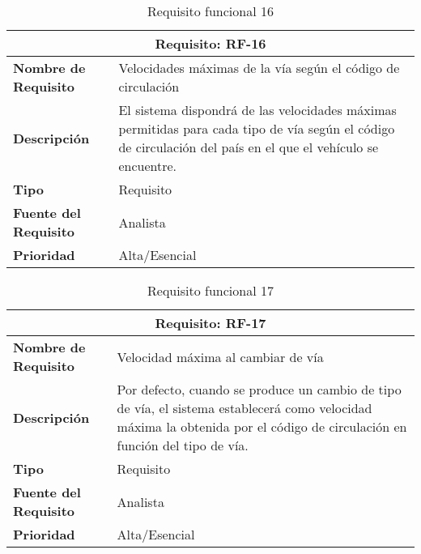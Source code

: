 \begin{table}[H]
\begin{center}
\begin{tabular}{p{} p{7cm}}
\multicolumn{2}{c}{\textbf{Requisito: RF-16} } \\
\hline \hline
\textbf{Nombre de Requisito} & Velocidades máximas de la vía según el código de circulación  \\
\hline
\textbf{Descripción} & El sistema dispondrá de las velocidades máximas permitidas para cada tipo de vía según el código de circulación del país en el que el vehículo se encuentre. \\
\hline
\textbf{Tipo} & Requisito \\
\hline
\textbf{Fuente del Requisito} & Analista \\
\hline
\textbf{Prioridad} & Alta/Esencial \\ \hline
\end{tabular}
\caption{Requisito funcional 16}
\label{tab:RF-16}
\end{center}
\end{table}


\begin{table}[H]
\begin{center}
\begin{tabular}{p{} p{7cm}}
\multicolumn{2}{c}{\textbf{Requisito: RF-17} } \\
\hline \hline
\textbf{Nombre de Requisito} & Velocidad máxima al cambiar de vía  \\
\hline
\textbf{Descripción} & Por defecto, cuando se produce un cambio de tipo de vía, el sistema establecerá como velocidad máxima la obtenida por el código de circulación en función del tipo de vía.\\
\hline
\textbf{Tipo} & Requisito \\
\hline
\textbf{Fuente del Requisito} & Analista \\
\hline
\textbf{Prioridad} & Alta/Esencial \\ \hline
\end{tabular}
\caption{Requisito funcional 17}
\label{tab:RF-17}
\end{center}
\end{table}

